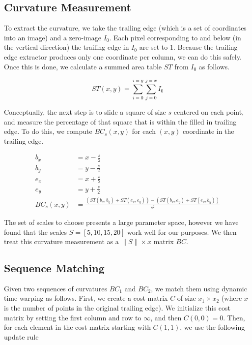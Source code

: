 \subsection{Curvature Measurement}

To extract the curvature, we take the trailing edge (which is a set of coordinates into an image) and a zero-image $I_0$.
Each pixel corresponding to and below (in the vertical direction) the trailing edge in $I_0$ are set to $1$.
Because the trailing edge extractor produces only one coordinate per column, we can do this safely.
Once this is done, we calculate a summed area table \cite{crow1984summed} $ST$ from $I_0$ as follows.

\begin{equation}
ST(x,y) = \sum_{i=0}^{i=y}\sum_{j=0}^{j=x} I_0 
\end{equation}

Conceptually, the next step is to slide a square of size $s$ centered on each point, and measure the percentage of that square that is within the filled in trailing edge.
To do this, we compute $BC_s(x, y)$ for each $(x, y)$ coordinate in the trailing edge.

\begin{align}
b_x &= x - \frac{s}{2}\\
b_y &= y - \frac{s}{2}\\
e_x &= x + \frac{s}{2}\\
e_y &= y + \frac{s}{2}\\
BC_s(x,y) &= \frac{(ST(b_x, b_y) + ST(e_x, e_y)) - (ST(b_x, e_y) + ST(e_x, b_y))}{s^2}
\end{align}

The set of scales to choose presents a large parameter space, however we have found that the scales $S = [5, 10, 15, 20]$ work well for our purposes.
We then treat this curvature measurement as a $\|S\| \times x$ matrix $BC$.

\subsection{Sequence Matching}

Given two sequences of curvatures $BC_1$ and $BC_2$, we match them using dynamic time warping as follows.
First, we create a cost matrix $C$ of size $x_1 \times x_2$ (where $x$ is the number of points in the original trailing edge).
We initialize this cost matrix by setting the first column and row to $\infty$, and then $C(0,0) = 0$.
Then, for each element in the cost matrix starting with $C(1,1)$, we use the following update rule

